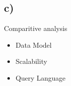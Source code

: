 \documentclass{article}
\begin{document}
\subsection*{\small c)}

Comparitive analysis
\begin{itemize}
\item Data Model
\item Scalability
\item Query Language
\end{itemize}
\end{document}
